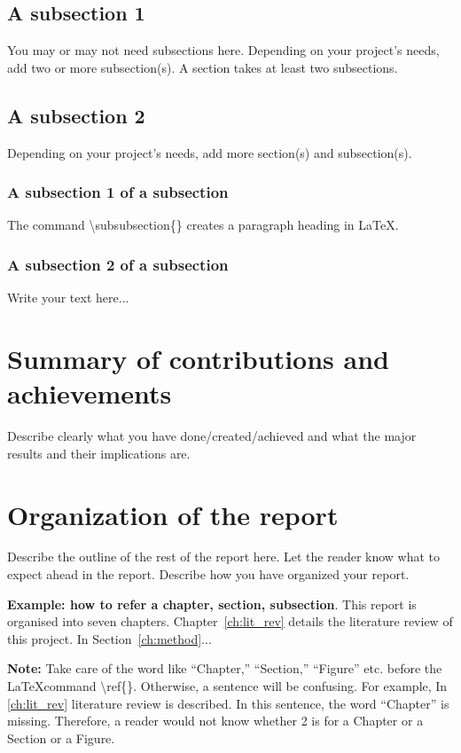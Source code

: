 \subsection{A subsection 1}
\label{sec:intro_some_sub1}
You may or may not need subsections here. Depending on your project's needs, add two or more subsection(s). A section takes at least two subsections. 

\subsection{A subsection 2}
\label{sec:intro_some_sub2}
Depending on your project's needs, add more section(s) and subsection(s).

\subsubsection{A subsection 1 of a subsection}
\label{sec:intro_some_subsub1}
The command \textbackslash subsubsection\{\} creates a paragraph heading in \LaTeX.

\subsubsection{A subsection 2 of a subsection}
\label{sec:intro_some_subsub2}
Write your text here...

\section{Summary of contributions and achievements} %
\label{sec:intro_sum_results} %
Describe clearly what you have done/created/achieved and what the major results and their implications are. 


\section{Organization of the report} %
\label{sec:intro_org} %
Describe the outline of the rest of the report here. Let the reader know what to expect ahead in the report. Describe how you have organized your report. 

\textbf{Example: how to refer a chapter, section, subsection}. This report is organised into seven chapters. Chapter~\ref{ch:lit_rev} details the literature review of this project. In Section~\ref{ch:method}...  %

\textbf{Note:}  Take care of the word like ``Chapter,'' ``Section,'' ``Figure'' etc. before the \LaTeX command \textbackslash ref\{\}. Otherwise, a  sentence will be confusing. For example, In \ref{ch:lit_rev} literature review is described. In this sentence, the word ``Chapter'' is missing. Therefore, a reader would not know whether 2 is for a Chapter or a Section or a Figure.